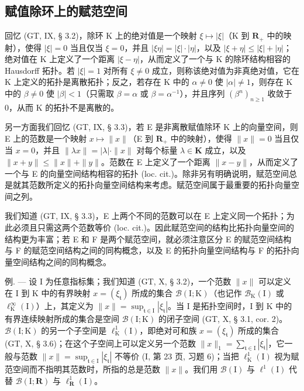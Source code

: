 \subsection{赋值除环上的赋范空间}

回忆 (GT, IX, § 3.2)，除环 K 上的绝对值是一个映射 \(\xi \mapsto |\xi|\)（K 到 \(\mathbf{R}_{+}\) 中的映射），使得 \(|\xi| = 0\) 当且仅当 \(\xi = 0\)，并且 \(|\xi \eta| = |\xi| \cdot |\eta|\)，以及 \(|\xi + \eta| \leqslant |\xi| + |\eta|\)；绝对值在 K 上定义了一个距离 \(|\xi - \eta|\)，从而定义了一个与 K 的除环结构相容的 Hausdorff 拓扑。若 \(|\xi| = 1\) 对所有 \(\xi \neq 0\) 成立，则称该绝对值为非真绝对值，它在 K 上定义的拓扑是离散拓扑；反之，若存在 K 中的 \(\alpha \neq 0\) 使 \(|\alpha| \neq 1\)，则存在 K 中的 \(\beta \neq 0\) 使 \(|\beta| < 1\)（只需取 \(\beta = \alpha\) 或 \(\beta = \alpha^{-1}\)），并且序列 \((\beta^n)_{n \geqslant 1}\) 收敛于 0，从而 K 的拓扑不是离散的。

另一方面我们回忆 (GT, IX, § 3.3)，若 E 是非离散赋值除环 K 上的向量空间，则 E 上的范数是一个映射 \(x \mapsto \|x\|\)（E 到 \(\mathbf{R}_{+}\) 中的映射），使得 \(\|x\| = 0\) 当且仅当 \(x = 0\)，并且 \(\| \lambda x \| = |\lambda| \cdot \| x\|\) 对每个标量 \(\lambda \in \mathbf{K}\) 成立，以及 \(\|x + y\| \leqslant \|x\| + \|y\|\)。范数在 E 上定义了一个距离 \(\|x - y\|\)，从而定义了一个与 E 的向量空间结构相容的拓扑 (loc. cit.)。除非另有明确说明，赋范空间总是就其范数所定义的拓扑向量空间结构来考虑。赋范空间属于最重要的拓扑向量空间之列。

我们知道 (GT, IX, § 3.3)，E 上两个不同的范数可以在 E 上定义同一个拓扑；为此必须且只需这两个范数等价 (loc. cit.)。因此赋范空间的结构比拓扑向量空间的结构更为丰富；若 E 和 F 是两个赋范空间，就必须注意区分 E 的赋范空间结构与 F 的赋范空间结构之间的同构概念，以及 E 的拓扑向量空间结构与 F 的拓扑向量空间结构之间的同构概念。

例. --- 设 I 为任意指标集；我们知道 (GT, X, § 3.2)，一个范数 \(\|x\|\) 可以定义在 I 到 K 中的有界映射 \(x = (\xi_{\mathfrak{t}})\) 所成的集合 \(\mathcal{B}(\mathrm{I};\mathrm{K})\)（也记作 \(\mathcal{B}_{\mathrm{K}}(\mathrm{I})\) 或 \(\ell_{\mathrm{K}}^{\infty}(\mathrm{I})\)）上，其定义为 \(\|x\| = \sup_{\mathfrak{t}\in \mathrm{I}}|\xi_{\mathfrak{t}}|\)。当 I 是拓扑空间时，I 到 K 中的有界连续映射所成的集合是空间 \(\mathcal{B}(\mathrm{I};\mathrm{K})\) 的闭子空间 (GT, X, § 3.1, cor. 2)。\(\mathcal{B}(\mathrm{I};\mathrm{K})\) 的另一个子空间是 \(\ell_{\mathrm{K}}^{1}(\mathrm{I})\)，即绝对可和族 \(x = (\xi_{\mathfrak{t}})\) 所成的集合 (GT, X, § 3.6)；在这个子空间上可以定义另一个范数 \(\|x\|_1 = \sum_{\mathfrak{t}\in \mathrm{I}}|\xi_{\mathfrak{t}}|\)，它一般与范数 \(\|x\| = \sup_{\mathfrak{t}\in \mathrm{I}}|\xi_{\mathfrak{t}}|\) 不等价 (I, 第 23 页, 习题 6)；当把 \(\ell_{\mathrm{K}}^{1}(\mathrm{I})\) 视为赋范空间而不指明其范数时，所指的总是范数 \(\|x\|\)。我们用 \(\mathcal{B}(\mathrm{I})\) 与 \(\ell^1 (\mathrm{I})\) 代替 \(\mathcal{B}(\mathrm{I};\mathbf{R})\) 与 \(\ell_{\mathbf{R}}^{1}(\mathrm{I})\)。

